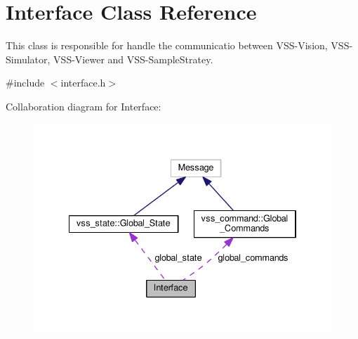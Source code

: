 \hypertarget{classInterface}{}\section{Interface Class Reference}
\label{classInterface}


This class is responsible for handle the communicatio between V\+S\+S-\/\+Vision, V\+S\+S-\/\+Simulator, V\+S\+S-\/\+Viewer and V\+S\+S-\/\+Sample\+Stratey.  




{\ttfamily \#include $<$interface.\+h$>$}



Collaboration diagram for Interface\+:
\nopagebreak
\begin{figure}[H]
\begin{center}
\leavevmode
\includegraphics[width=334pt]{classInterface__coll__graph}
\end{center}
\end{figure}
